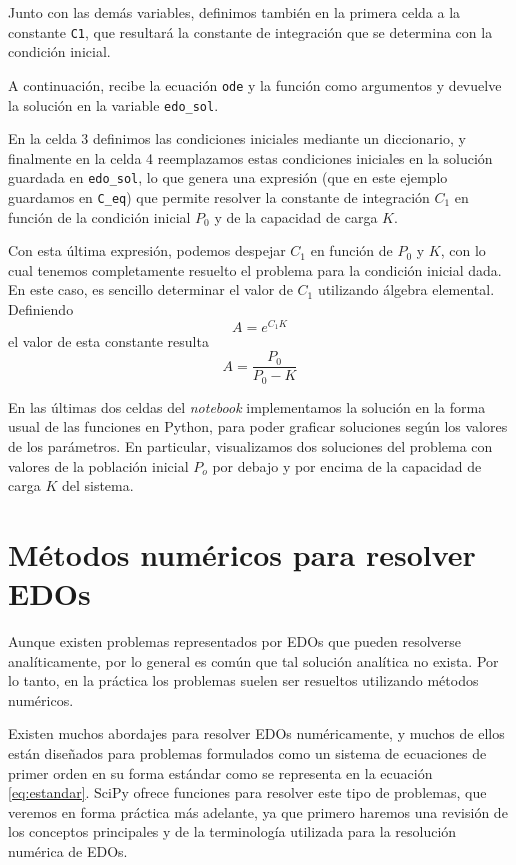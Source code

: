 
Junto con las demás variables, definimos también en la primera celda a la constante \verb|C1|, que resultará la constante de integración que se determina con la condición inicial.

A continuación,  recibe la ecuación \verb|ode| y la función  como argumentos y devuelve la solución en la variable \verb|edo_sol|. 


En la celda 3 definimos las condiciones iniciales mediante un diccionario, y finalmente en la celda 4 reemplazamos estas condiciones iniciales en la solución guardada en \verb|edo_sol|, lo que genera una expresión (que en este ejemplo guardamos en \verb|C_eq|) que permite resolver la constante de integración $C_1$ en función de la condición inicial $P_0$ y de la capacidad de carga $K$.


Con esta última expresión, podemos despejar $C_1$ en función de $P_0$ y $K$, con lo cual tenemos completamente resuelto el problema para la condición inicial dada. En este caso, es sencillo determinar el valor de $C_1$ utilizando álgebra elemental. Definiendo
\[ A = e^{C_1 K} \]
el valor de esta constante resulta
\[ A = \frac{P_0}{P_0 - K} \]

En las últimas dos celdas del \textit{notebook} implementamos la solución en la forma usual de las funciones en Python, para poder graficar soluciones según los valores de los parámetros. En particular, visualizamos dos soluciones del problema con valores de la población inicial $P_o$ por debajo y por encima de la capacidad de carga $K$ del sistema.



\section{Métodos numéricos para resolver EDOs}
Aunque existen problemas representados por EDOs que pueden resolverse analíticamente, por lo general es común que tal solución analítica no exista. Por lo tanto, en la práctica los problemas suelen ser resueltos utilizando métodos numéricos.

Existen muchos abordajes para resolver EDOs numéricamente, y muchos de ellos están diseñados para problemas formulados como un sistema de ecuaciones de primer orden en su forma estándar como se representa en la ecuación \ref{eq:estandar}. SciPy ofrece funciones para resolver este tipo de problemas, que veremos en forma práctica más adelante, ya que primero haremos una revisión de los conceptos principales y de la terminología utilizada para la resolución numérica de EDOs.

